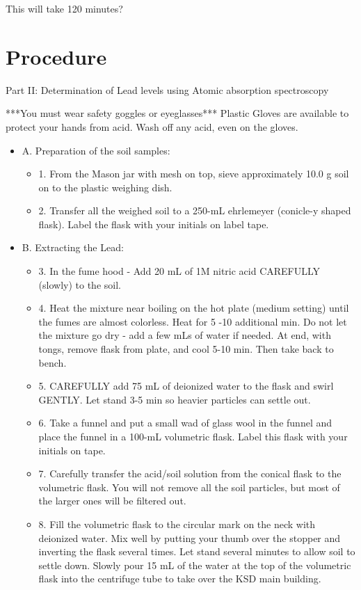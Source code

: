 \documentclass[12pt]{../SOP2}
\begin{document}
\NP This will take 120 minutes?

\section{Procedure}
\NP Part II: Determination of Lead levels using Atomic absorption spectroscopy

***You must wear safety goggles or eyeglasses***
Plastic Gloves are available to protect your hands from acid. Wash off any acid, even on the gloves.
\begin{itemize}
  \item A. Preparation of the soil samples:
  \begin{itemize}
    \item 1. From the Mason jar with mesh on top, sieve approximately 10.0 g soil on to the plastic weighing dish.
    \item 2. Transfer all the weighed soil to a 250-mL ehrlemeyer (conicle-y shaped flask). Label the flask with your initials on label tape. 
  \end{itemize}
  \item B. Extracting the Lead:
  \begin{itemize}
    \item 3. In the fume hood - Add 20 mL of 1M nitric acid CAREFULLY (slowly) to the soil.
    \item 4. Heat the mixture near boiling on the hot plate (medium setting) until the fumes are almost colorless. Heat for 5 -10 additional min. Do not let the mixture go dry - add a few mLs of water if needed. At end, with tongs, remove flask from plate, and cool 5-10 min. Then take back to bench.
    \item 5. CAREFULLY add 75 mL of deionized water to the flask and swirl GENTLY. Let stand 3-5 min so heavier particles can  settle out.
    \item 6. Take a funnel and put a small wad of glass wool in the funnel and place the funnel in a 100-mL volumetric flask.    Label this flask with your initials on tape.
    \item 7. Carefully transfer the acid/soil solution from the conical flask to the volumetric flask. You will not remove all the soil particles, but most of the larger ones will be filtered out.
    \item 8. Fill the volumetric flask to the circular mark on the neck with deionized water. Mix well by putting your thumb over the stopper and inverting the flask several times. Let stand several minutes to allow soil to settle down. Slowly pour 15 mL of the water at the top of the volumetric flask into the centrifuge tube to take over the KSD main building.

\end{itemize}
\end{itemize}
\end{document}

